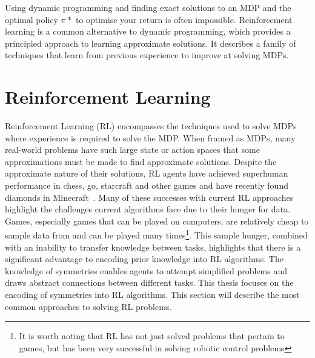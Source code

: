 Using dynamic programming and finding exact solutions to an MDP and the optimal policy $\pi*$ to optimise your return is often impossible. Reinforcement learning is a common alternative to dynamic programming, which provides a principled approach to learning approximate solutions. It describes a family of techniques that learn from previous experience to improve at solving MDPs.

\section{Reinforcement Learning}
Reinforcement Learning (RL) encompasses the techniques used to solve MDPs where experience is required to solve the MDP. When framed as MDPs, many real-world problems have such large state or action spaces that some approximations must be made to find approximate solutions. Despite the approximate nature of their solutions, RL agents have achieved superhuman performance in chess, go, starcraft and other games and have recently found diamonds in Minecraft~\cite {silver2016mastering,silver2017mastering,hafner2023mastering}. Many of these successes with current RL approaches highlight the challenges current algorithms face due to their hunger for data. Games, especially games that can be played on computers, are relatively cheap to sample data from and can be played many times\footnote{It is worth noting that RL has not just solved problems that pertain to games, but has been very successful in solving robotic control problems}. This sample hunger, combined with an inability to transfer knowledge between tasks, highlights that there is a significant advantage to encoding prior knowledge into RL algorithms. The knowledge of symmetries enables agents to attempt simplified problems and draws abstract connections between different tasks. This thesis focuses on the encoding of symmetries into RL algorithms. This section will describe the most common approaches to solving RL problems.

